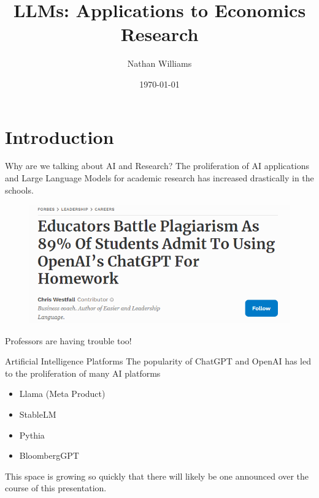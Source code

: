 \documentclass[aspectratio=43]{beamer}
\title{LLMs: Applications to Economics Research}
\date{\today}
\author{Nathan Williams}
\begin{document}
\begin{frame}
\maketitle
\end{frame}
\section{Introduction}
\begin{frame}{Why are we talking about AI and Research?}
    The proliferation of AI applications and Large Language Models for academic research has increased drastically in the schools.
    \begin{figure}
        \centering
        \includegraphics{News Screeenshot 1.png}
        \label{News Article}
    \end{figure}
\end{frame}
\begin{frame}{Professors are having trouble too!}
    
\end{frame}
\begin{frame}{Artificial Intelligence Platforms}
    The popularity of ChatGPT and OpenAI has led to the proliferation of many AI platforms
    \begin{itemize}
        \item Llama (Meta Product)
        \item StableLM
        \item Pythia
        \item BloombergGPT
    \end{itemize}
    This space is growing so quickly that there will likely be one announced over the course of this presentation.
\end{frame}
\end{document}
